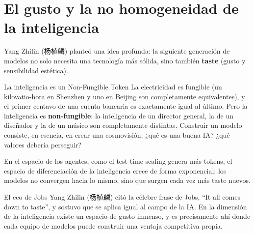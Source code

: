 \section{El gusto y la no homogeneidad de la inteligencia}

Yang Zhilin (杨植麟) planteó una idea profunda: la siguiente generación de modelos no solo necesita una tecnología más sólida, sino también \textbf{taste} (gusto y sensibilidad estética).

\begin{importantbox}{La inteligencia es un Non-Fungible Token}
La electricidad es fungible (un kilovatio-hora en Shenzhen y uno en Beijing son completamente equivalentes), y el primer centavo de una cuenta bancaria es exactamente igual al último. Pero la inteligencia es \textbf{non-fungible}: la inteligencia de un director general, la de un diseñador y la de un músico son completamente distintas. Construir un modelo consiste, en esencia, en crear una cosmovisión: ¿qué es una buena IA? ¿qué valores debería perseguir?
\end{importantbox}

En el espacio de los agentes, como el test-time scaling genera más tokens, el espacio de diferenciación de la inteligencia crece de forma exponencial: los modelos no convergen hacia lo mismo, sino que surgen cada vez más taste nuevos.

\begin{knowledgebox}{El eco de Jobs}
Yang Zhilin (杨植麟) citó la célebre frase de Jobs, ``It all comes down to taste'', y sostuvo que se aplica igual al campo de la IA. En la dimensión de la inteligencia existe un espacio de gusto inmenso, y es precisamente ahí donde cada equipo de modelos puede construir una ventaja competitiva propia.
\end{knowledgebox}


